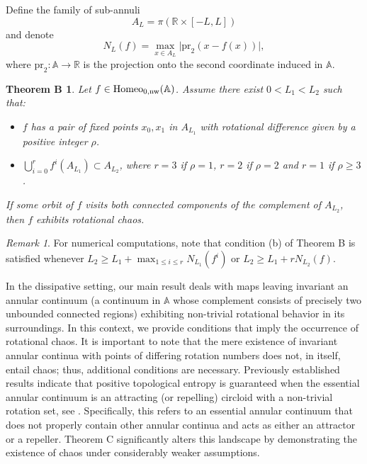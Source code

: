 \documentclass[12pt,a4paper]{amsart}
\newtheorem*{thmB}{Theorem B}
\theoremstyle{definition}
\theoremstyle{remark}
\newtheorem{obs}[thm]{Remark}
\newcommand{\R}{\mathbb{R}}
\newcommand{\A}{\mathbb{A}}
\begin{document}
Define the family of sub-annuli
$$A_L=\pi(\R\times[-L,L])$$
and denote 
$$ N_L(f)=\max_{x\in A_L}\vert \textrm{pr}_2\left(x-f(x)\right)\vert,$$ where 
$\textrm{pr}_2:\A\to\R$ is the projection onto the second coordinate induced in $\A$.

\begin{thmB}\label{c.hamiltoniancasedif}
Let $f\in\textrm{\normalfont{Homeo}}_{0,\textrm{\normalfont{nw}}}(\A)$. Assume there exist $0<L_1<L_2$ such that:
\begin{itemize}
\item[(a)] $f$ has a pair of fixed points $x_0,x_1$ in $A_{L_1}$ with rotational difference given by
a positive integer $\rho$.
\item[(b)] $\bigcup_{i=0}^{r} f^{i}(A_{L_1})\subset A_{L_2}$, where $r=3$ if $\rho=1$, $r=2$ if $\rho=2$ and $r=1$ if $\rho\ge 3$.
\end{itemize}
If some orbit of $f$ visits both connected components of the complement of
$A_{L_2}$, then $f$ exhibits rotational chaos. 
\end{thmB}

\begin{obs}
For numerical computations, note that condition (b) of Theorem B is satisfied whenever $L_2\ge L_1+\max_{1\le i\le r}N_{L_1}(f^i)$ or $L_2\ge L_1+rN_{L_2}(f)$.
\end{obs}


In the dissipative setting, our main result deals with maps leaving invariant an annular continuum (a continuum in $\A$ whose complement consists of precisely two unbounded connected regions) exhibiting non-trivial rotational behavior in its surroundings. In this context, we provide conditions that imply the occurrence of rotational chaos. It is important to note that the mere existence of invariant annular continua with points of differing rotation numbers does not, in itself, entail chaos; thus, additional conditions are necessary. Previously established results indicate that positive topological entropy is guaranteed when the essential annular continuum is an attracting (or repelling) circloid with a non-trivial rotation set, see \cite{paposa, lecalveztal}. Specifically, this refers to an essential annular continuum that does not properly contain other annular continua and acts as either an attractor or a repeller. Theorem C significantly alters this landscape by demonstrating the existence of chaos under considerably weaker assumptions.
\end{document}
